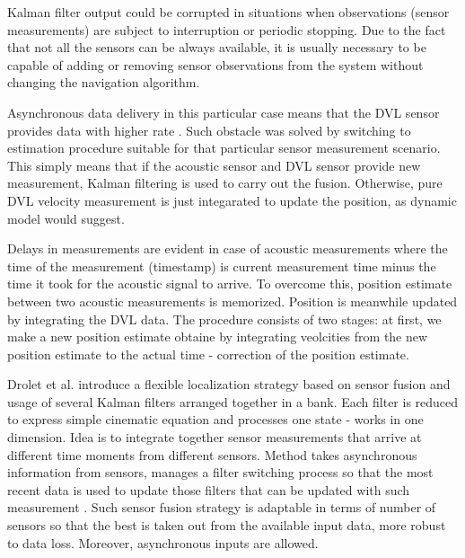 Kalman filter output could be corrupted in situations when observations (sensor measurements) are subject to interruption or periodic stopping. Due to the fact that not all the sensors can be always available, it is usually necessary to be capable of adding or removing sensor observations from the system without changing the navigation algorithm. 

Asynchronous data delivery in this particular case means that the DVL sensor provides data with higher rate \cite{blain03}. Such obstacle was solved by switching to estimation procedure suitable for that particular sensor measurement scenario. This simply means that if the acoustic sensor and DVL sensor provide new measurement, Kalman filtering is used to carry out the fusion. Otherwise, pure DVL velocity measurement is just integarated to update the position, as dynamic model would suggest. 

Delays in measurements are evident in case of acoustic measurements where the time of the measurement (timestamp) is current measurement time minus the time it took for the acoustic signal to arrive. To overcome this, position estimate between two acoustic measurements is memorized. Position is meanwhile updated by integrating the DVL data. The procedure consists of two stages: at first, we make a new position estimate obtaine by integrating veolcities from the new position estimate to the actual time - correction of the position estimate. 

Drolet et al. \cite{drolet00} introduce a flexible localization strategy based on sensor fusion and usage of several Kalman filters arranged together in a bank. Each filter is reduced to express simple cinematic equation and processes one state - works in one dimension. Idea is to integrate together sensor measurements that arrive at different time moments from different sensors. Method takes asynchronous information from sensors, manages a filter switching process so that the most recent data is used to update those filters that can be updated with such measurement \cite{drolet00}. Such sensor fusion strategy is adaptable in terms of number of sensors so that the best is taken out from the available input data, more robust to data loss. Moreover, asynchronous inputs are allowed. 

